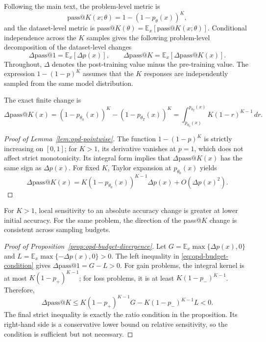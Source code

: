 \documentclass{article}
\theoremstyle{opdplain}
\begin{document}
Following the main text, the problem-level metric is
\[
 \mathrm{pass}@K(x;\theta)=1-(1-p_\theta(x))^K,
\]
and the dataset-level metric is $\mathrm{pass}@K(\theta)=\mathbb E_x[\mathrm{pass}@K(x;\theta)]$. Conditional independence across the $K$ samples gives the following problem-level decomposition of the dataset-level changes
\[
 \Delta\mathrm{pass}@1=\mathbb E_x[\Delta p(x)],\qquad
 \Delta\mathrm{pass}@K=\mathbb E_x[\Delta\mathrm{pass}@K(x)].
\]
Throughout, $\Delta$ denotes the post-training value minus the pre-training value. The expression $1-(1-p)^K$ assumes that the $K$ responses are independently sampled from the same model distribution.

The exact finite change is
\[
 \Delta\mathrm{pass}@K(x)
 =(1-p_{\theta_0}(x))^K-(1-p_{\theta_T}(x))^K
 =\int_{p_{\theta_0}(x)}^{p_{\theta_T}(x)}K(1-r)^{K-1}\,dr.
\]

\begin{proof}[Proof of Lemma~\ref{lem:opd-pointwise}]
The function $1-(1-p)^K$ is strictly increasing on $[0,1]$; for $K>1$, its derivative vanishes at $p=1$, which does not affect strict monotonicity. Its integral form implies that $\Delta\mathrm{pass}@K(x)$ has the same sign as $\Delta p(x)$. For fixed $K$, Taylor expansion at $p_{\theta_0}(x)$ yields
\[
 \Delta\mathrm{pass}@K(x)
 =K(1-p_{\theta_0}(x))^{K-1}\Delta p(x)+O(\Delta p(x)^2).
\]
\end{proof}
For $K>1$, local sensitivity to an absolute accuracy change is greater at lower initial accuracy. For the same problem, the direction of the pass@$K$ change is consistent across sampling budgets.

\begin{proof}[Proof of Proposition~\ref{prop:opd-budget-divergence}]
Let $G=\mathbb E_x\max\{\Delta p(x),0\}$ and $L=\mathbb E_x\max\{-\Delta p(x),0\}>0$. The left inequality in \eqref{eq:opd-budget-condition} gives $\Delta\mathrm{pass}@1=G-L>0$. For gain problems, the integral kernel is at most $K(1-p_{+})^{K-1}$; for loss problems, it is at least $K(1-p_{-})^{K-1}$. Therefore,
\begin{equation}
\label{eq:opd-budget-bound}
 \Delta\mathrm{pass}@K
 \le K(1-p_{+})^{K-1}G-K(1-p_{-})^{K-1}L<0.
\end{equation}
The final strict inequality is exactly the ratio condition in the proposition. Its right-hand side is a conservative lower bound on relative sensitivity, so the condition is sufficient but not necessary.
\end{proof}
\end{document}
